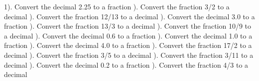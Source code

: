 \documentclass{article}%
\begin{document}
1). Convert the decimal 2.25 to a fraction%
\newline%
\newline%
). Convert the fraction 3/2 to a decimal%
\newline%
\newline%
). Convert the fraction 12/13 to a decimal%
\newline%
\newline%
). Convert the decimal 3.0 to a fraction%
\newline%
\newline%
). Convert the fraction 13/3 to a decimal%
\newline%
\newline%
). Convert the fraction 10/9 to a decimal%
\newline%
\newline%
). Convert the decimal 0.6 to a fraction%
\newline%
\newline%
). Convert the decimal 1.0 to a fraction%
\newline%
\newline%
). Convert the decimal 4.0 to a fraction%
\newline%
\newline%
). Convert the fraction 17/2 to a decimal%
\newline%
\newline%
). Convert the fraction 3/5 to a decimal%
\newline%
\newline%
). Convert the fraction 3/11 to a decimal%
\newline%
\newline%
). Convert the decimal 0.2 to a fraction%
\newline%
\newline%
). Convert the fraction 4/3 to a decimal%
\newline%
\end{document}
